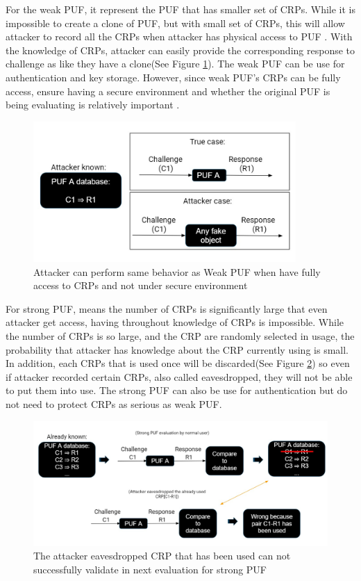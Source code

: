For the weak PUF, it represent the PUF that has smaller set of CRPs. While it is impossible to 
create a clone of PUF, but with small set of CRPs, this will allow attacker to record all the CRPs when attacker has physical access to PUF \cite{Reference1}. With the knowledge of CRPs, attacker can easily provide the corresponding
response to challenge as like they have a clone(See Figure \ref{fig:figure2}). The weak PUF can be use for authentication and key storage. However, since weak PUF's CRPs can be fully access, ensure having a secure environment and whether the original PUF is being evaluating is relatively important \cite{Reference1}.
\begin{figure}[htp]
    \centering
    \includegraphics[width=10cm]{figures/figure2.jpg}
    \caption{Attacker can perform same behavior as Weak PUF when have fully access to CRPs and not under secure environment}
    \label{fig:figure2}
    \end{figure}

For strong PUF, means the number of CRPs is significantly large that even attacker get access, having throughout knowledge of CRPs is impossible. While the number of CRPs is so large,
and the CRP are randomly selected in usage, the probability that attacker has knowledge about the CRP currently using is small. In addition, each CRPs that is used once will 
be discarded(See Figure \ref{fig:figure3}) so even if attacker recorded certain CRPs, also called eavesdropped, they will not be able to put them into use. The strong PUF can also be use for authentication but do not need to protect CRPs
as serious as weak PUF.

\begin{figure}[htp]
    \centering
    \includegraphics[width=15cm]{figures/figure3.jpg}
    \caption{The attacker eavesdropped CRP that has been used can not successfully validate in next evaluation for strong PUF}
    \label{fig:figure3}
    \end{figure}

